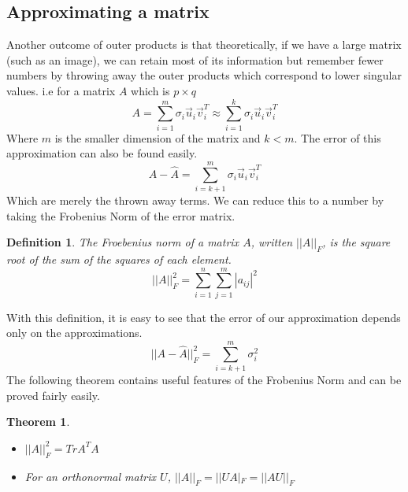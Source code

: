 \documentclass{article}
\newtheorem{theorem}{Theorem}
\newtheorem{definition}{Definition}
\begin{document}
\subsection{Approximating a matrix}
Another outcome of outer products is that theoretically, if we have a large matrix (such as an image),
we can retain most of its information but remember fewer numbers by throwing away the outer products which correspond to lower singular values.
i.e for a matrix $A$ which is $p \times q$
$$A = \sum_{i=1}^{m}{\sigma_i\vec{u}_i\vec{v}_i^T} \approx \sum_{i=1}^{k}{\sigma_i\vec{u}_i\vec{v}_i^T}$$
Where $m$ is the smaller dimension of the matrix and $k < m$. The error of this approximation can also be found easily.
$$A - \hat{A} = \sum_{i=k+1}^{m}{\sigma_i\vec{u}_i\vec{v}_i^T}$$
Which are merely the thrown away terms. We can reduce this to a number by taking the Frobenius Norm of the error matrix.
\begin{definition}
    The Froebenius norm of a matrix $A$, written $||A||_F$, is the square root of the sum of the squares of each element.
    $$||A||_F^2 = \sum_{i=1}^{n}{\sum_{j=1}^{m}{|a_{ij}|^2}}$$
\end{definition}
With this definition, it is easy to see that the error of our approximation depends only on the approximations.
$$||A-\hat{A}||_F^2 = \sum_{i=k+1}^{m}{\sigma_i^2}$$
The following theorem contains useful features of the Frobenius Norm and can be proved fairly easily.
\begin{theorem}
    \begin{itemize}
        \item[1. ] $||A||_F^2=Tr{A^TA}$
        \item[2. ] For an orthonormal matrix $U$, $||A||_F=||UA|_F=||AU||_F$
    \end{itemize}
\end{theorem}
\end{document}
